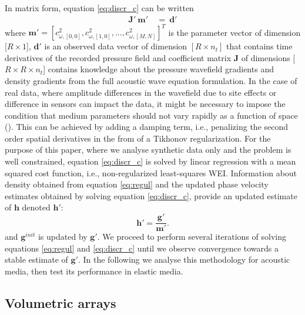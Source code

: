 \documentclass{article}
\begin{document}
	In matrix form, equation \eqref{eq:discr_c} can be written
	\begin{align}
		\bm{J}' \: \bm{m}' &\: = \: \bm{d'}
	\end{align}
	where  $ \mathbf{m}' = [c_{\omega,[0,0]}^{2}, c_{\omega,[1,0]}^{2},..., c_{\omega,[M,N]}^{2}]^{T}$ is the parameter vector of dimension [$R \times 1$], $\mathbf{d'}$ is an observed data vector of dimension $[R \times n_{t}]$ that contains time derivatives of the recorded pressure field and coefficient matrix $\bm{J}$ of dimensions [$R \times R \times n_{t}$] contains  knowledge about the pressure wavefield gradients and density gradients from the full acoustic wave equation formulation. In the case of real data, where amplitude differences in the wavefield due to site effects or difference in sensors can impact the data, it might be necessary to impose the condition that medium parameters should not vary rapidly as a function of space (\cite{de2015near}). This can be achieved by adding a damping term, i.e., penalizing the second order spatial derivatives in the from of a Tikhonov regularization. For the purpose of this paper, where we analyse synthetic data only and the problem is well constrained, equation \eqref{eq:discr_c} is solved by linear regression with a mean squared cost function, i.e., non-regularized least-squares WEI. Information about density obtained from equation \eqref{eq:regul} and the updated phase velocity estimates obtained by solving equation \eqref{eq:discr_c}, provide an updated estimate of $\bm{h}$ denoted $\bm{h}'$:
	\begin{equation}
		\bm{h}' = \frac{\bm{g}'}{\bm{m}'}.
	\end{equation}
	and $\bm{g}^{init}$ is updated by $\bm{g}'$. We proceed to perform several iterations of solving equations \eqref{eq:regul} and \eqref{eq:discr_c} until we observe convergence towards a stable estimate of $\bm{g}'$. In the following we analyse this methodology for acoustic media, then test its performance in elastic media. %
	
	
	\subsection{Volumetric arrays} \label{methV}
	
\end{document}
